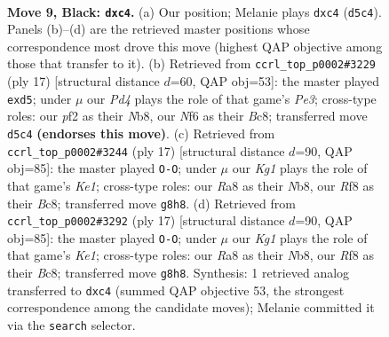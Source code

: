 \documentclass[11pt]{article}
\begin{document}
\clearpage

\begin{figure}[p]\centering
\begin{subfigure}{0.46\textwidth}\centering
\resizebox{\linewidth}{!}{%
\newchessgame
\chessboard[
  setfen={rnb2rk1/pp3ppp/3qpn2/3p4/2Pp3P/3BPN2/PP3PP1/RN1QK2R b KQ - 0 9},
  showmover=false,
  pgfstyle=straightmove, color=movearrow, markmove={d5-c4}
]}
\caption{}
\end{subfigure}\hfill
\begin{subfigure}{0.46\textwidth}\centering
\resizebox{\linewidth}{!}{%
\newchessgame
\chessboard[
  setfen={rnb2rk1/p1p1qppp/1p2p3/3P3n/3P4/3BPN2/PP3PPP/RN1QK2R b KQ - 0 9},
  showmover=false,
  pgfstyle=straightmove, color=movearrow, markmove={e6-d5}
]}
\caption{}
\end{subfigure}
\\[4pt]
\begin{subfigure}{0.46\textwidth}\centering
\resizebox{\linewidth}{!}{%
\newchessgame
\chessboard[
  setfen={rnbqk2r/pp2ppbp/5np1/3p4/2PP4/2NB1N1P/PP3PP1/R1BQK2R b KQkq - 0 9},
  showmover=false,
  pgfstyle=straightmove, color=movearrow, markmove={e8-g8}
]}
\caption{}
\end{subfigure}\hfill
\begin{subfigure}{0.46\textwidth}\centering
\resizebox{\linewidth}{!}{%
\newchessgame
\chessboard[
  setfen={rnbqk2r/pp2ppbp/5np1/3p4/2PP4/2NB1N1P/PP3PP1/R1BQK2R b KQkq - 1 9},
  showmover=false,
  pgfstyle=straightmove, color=movearrow, markmove={e8-g8}
]}
\caption{}
\end{subfigure}
\caption{\textbf{Move 9, Black: \texttt{dxc4}.} (a) Our position; Melanie plays \texttt{dxc4} (\texttt{d5c4}). Panels (b)--(d) are the retrieved master positions whose correspondence most drove this move (highest QAP objective among those that transfer to it). (b) Retrieved from \texttt{ccrl\_top\_p0002\#3229} (ply 17) [structural distance $d$=60, QAP obj=53]: the master played \texttt{exd5}; under $\mu$ our \emph{Pd4} plays the role of that game's \emph{Pe3}; cross-type roles: our \emph{p}f2 as their \emph{N}b8, our \emph{N}f6 as their \emph{B}c8; transferred move \texttt{d5c4} \textbf{(endorses this move)}. (c) Retrieved from \texttt{ccrl\_top\_p0002\#3244} (ply 17) [structural distance $d$=90, QAP obj=85]: the master played \texttt{O-O}; under $\mu$ our \emph{Kg1} plays the role of that game's \emph{Ke1}; cross-type roles: our \emph{R}a8 as their \emph{N}b8, our \emph{R}f8 as their \emph{B}c8; transferred move \texttt{g8h8}. (d) Retrieved from \texttt{ccrl\_top\_p0002\#3292} (ply 17) [structural distance $d$=90, QAP obj=85]: the master played \texttt{O-O}; under $\mu$ our \emph{Kg1} plays the role of that game's \emph{Ke1}; cross-type roles: our \emph{R}a8 as their \emph{N}b8, our \emph{R}f8 as their \emph{B}c8; transferred move \texttt{g8h8}. Synthesis: 1 retrieved analog transferred to \texttt{dxc4} (summed QAP objective 53, the strongest correspondence among the candidate moves); Melanie committed it via the \texttt{search} selector.}
\label{fig:thought-m17}
\end{figure}
\end{document}
